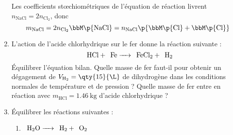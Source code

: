 \documentclass[a4paper,french,bookmarks]{article}
\begin{document}
\begin{enumerate}
{            Les coefficients st\oe{}chiométriques de l'équation de réaction livrent $n_{\text{NaCl}} = 2n_{\text{Cl}_2}$, donc
            \[ m_{\text{NaCl}} = 2n_{\text{Cl}_2}\bbM\p{\text{NaCl}} = n_{\text{NaCl}}\p{\bbM\p{\text{Cl}} + \bbM\p{\text{Cl}}} \]
        }
        \nobefore\yesafter
        \yesbefore
        
        \item L'action de l'acide chlorhydrique sur le fer donne la réaction suivante :
        \[ \phantom{2}\text{HCl} + \phantom{1}\text{Fe} \xrightarrow{\hspace{0.4cm}} \phantom{1}\text{FeCl}_2 + \phantom{1}\text H_2\]
        Équilibrer l'équation bilan. Quelle masse de fer faut-il pour obtenir un dégagement de $V_{\text H_2} = \qty{15}{\L}$ de dihydrogène dans les conditions normales de température et de pression ? Quelle masse de fer entre en réaction avec $m_\text{HCl} = \qty{1,46}{\kg}$ d'acide chlorhydrique ?
        
        \noafter
        \nobefore\yesafter
        \yesbefore
        
        \item Équilibrer les réactions suivantes :
        \begin{enumerate}
            \item $\phantom{2}\text H_2\text O \xrightarrow{\hspace{0.4cm}} \phantom{2}\text H_2 + \phantom{1}\text O_2$
            

\end{enumerate}
\end{enumerate}
\end{document}
